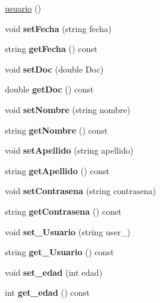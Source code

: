 \begin{DoxyCompactItemize}
\item 
\hyperlink{classusuario_a31d080a47bebcedffe122527e3389648}{usuario} ()
\item 
\mbox{\label{classusuario_afae576238cc91e38757c09f5b223913c}} 
void {\bfseries set\+Fecha} (string fecha)
\item 
\mbox{\label{classusuario_a2b1e59077c6f3db48ec180f5a8d10d84}} 
string {\bfseries get\+Fecha} () const
\item 
\mbox{\label{classusuario_a03e0eb35fb6274e77e016132b907ddcc}} 
void {\bfseries set\+Doc} (double Doc)
\item 
\mbox{\label{classusuario_a59b68b87c3000a9c25aed5e82578d5e8}} 
double {\bfseries get\+Doc} () const
\item 
\mbox{\label{classusuario_ad6a75d542d7bcf4b7c073dcb5de2e5a4}} 
void {\bfseries set\+Nombre} (string nombre)
\item 
\mbox{\label{classusuario_a2071eb11fa831ef2a05915c8168f6a94}} 
string {\bfseries get\+Nombre} () const
\item 
\mbox{\label{classusuario_af271213c4f37acb50eb01c6741671786}} 
void {\bfseries set\+Apellido} (string apellido)
\item 
\mbox{\label{classusuario_a5189ddcbb2faff1cd493f815183b9475}} 
string {\bfseries get\+Apellido} () const
\item 
\mbox{\label{classusuario_aaf2f2b6af8aa2201c6afcf4d6cfccd22}} 
void {\bfseries set\+Contrasena} (string contrasena)
\item 
\mbox{\label{classusuario_a3e9a305e92d2c1b0f351d9b516bc3c76}} 
string {\bfseries get\+Contrasena} () const
\item 
\mbox{\label{classusuario_a6afeca232fe67fa3f434e86d7e7048f6}} 
void {\bfseries set\+\_\+\+Usuario} (string user\+\_)
\item 
\mbox{\label{classusuario_ae7f5ee4ff05f174e7439b3541678b9ae}} 
string {\bfseries get\+\_\+\+Usuario} () const
\item 
\mbox{\label{classusuario_aa040e5b3258ad6a1878e9429603d722c}} 
void {\bfseries set\+\_\+edad} (int edad)
\item 
\mbox{\label{classusuario_ada8475d0d4bc0240b5b3be3be9cb5564}} 
int {\bfseries get\+\_\+edad} () const
\end{DoxyCompactItemize}


